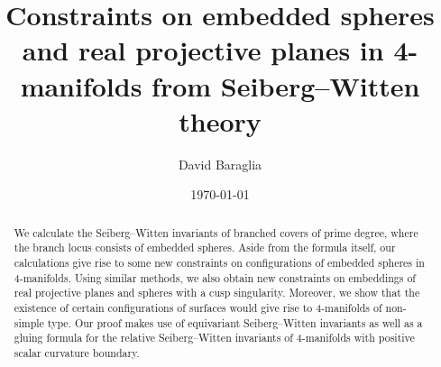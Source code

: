 \documentclass{amsart}
\theoremstyle{definition}
\theoremstyle{remark}
\numberwithin{equation}{section}
\begin{document}
\setlength\parskip{0.5em plus 0.1em minus 0.2em}

\title[Constraints on embedded spheres and real projective planes]{Constraints on embedded spheres and real projective planes in 4-manifolds from Seiberg--Witten theory}
\author{David Baraglia}


\address{School of Mathematical Sciences, The University of Adelaide, Adelaide SA 5005, Australia}





\date{\today}


\begin{abstract}

We calculate the Seiberg--Witten invariants of branched covers of prime degree, where the branch locus consists of embedded spheres. Aside from the formula itself, our calculations give rise to some new constraints on configurations of embedded spheres in $4$-manifolds. Using similar methods, we also obtain new constraints on embeddings of real projective planes and spheres with a cusp singularity. Moreover, we show that the existence of certain configurations of surfaces would give rise to $4$-manifolds of non-simple type. Our proof makes use of equivariant Seiberg--Witten invariants as well as a gluing formula for the relative Seiberg--Witten invariants of $4$-manifolds with positive scalar curvature boundary.

\end{abstract}



\maketitle

\end{document}
